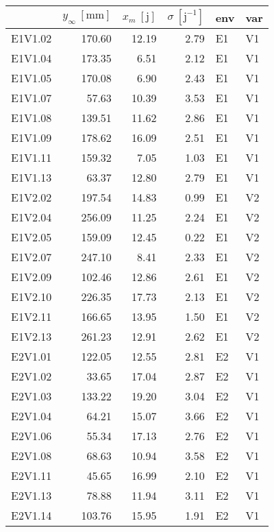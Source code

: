 \begin{table}[ht]
\centering
\begingroup\scriptsize
\begin{tabular}{rrrrll}
  \hline
 & $y_\infty\ \left[\text{mm}\right]$ & $x_m\ \left[\text{j}\right]$ & $\sigma\ \left[\text{j}^{-1}\right]$ & env & var \\ 
  \hline
E1V1.02 & 170.60 & 12.19 & 2.79 & E1 & V1 \\ 
  E1V1.04 & 173.35 & 6.51 & 2.12 & E1 & V1 \\ 
  E1V1.05 & 170.08 & 6.90 & 2.43 & E1 & V1 \\ 
  E1V1.07 & 57.63 & 10.39 & 3.53 & E1 & V1 \\ 
  E1V1.08 & 139.51 & 11.62 & 2.86 & E1 & V1 \\ 
  E1V1.09 & 178.62 & 16.09 & 2.51 & E1 & V1 \\ 
  E1V1.11 & 159.32 & 7.05 & 1.03 & E1 & V1 \\ 
  E1V1.13 & 63.37 & 12.80 & 2.79 & E1 & V1 \\ 
  E1V2.02 & 197.54 & 14.83 & 0.99 & E1 & V2 \\ 
  E1V2.04 & 256.09 & 11.25 & 2.24 & E1 & V2 \\ 
  E1V2.05 & 159.09 & 12.45 & 0.22 & E1 & V2 \\ 
  E1V2.07 & 247.10 & 8.41 & 2.33 & E1 & V2 \\ 
  E1V2.09 & 102.46 & 12.86 & 2.61 & E1 & V2 \\ 
  E1V2.10 & 226.35 & 17.73 & 2.13 & E1 & V2 \\ 
  E1V2.11 & 166.65 & 13.95 & 1.50 & E1 & V2 \\ 
  E1V2.13 & 261.23 & 12.91 & 2.62 & E1 & V2 \\ 
  E2V1.01 & 122.05 & 12.55 & 2.81 & E2 & V1 \\ 
  E2V1.02 & 33.65 & 17.04 & 2.87 & E2 & V1 \\ 
  E2V1.03 & 133.22 & 19.20 & 3.04 & E2 & V1 \\ 
  E2V1.04 & 64.21 & 15.07 & 3.66 & E2 & V1 \\ 
  E2V1.06 & 55.34 & 17.13 & 2.76 & E2 & V1 \\ 
  E2V1.08 & 68.63 & 10.94 & 3.58 & E2 & V1 \\ 
  E2V1.11 & 45.65 & 16.99 & 2.10 & E2 & V1 \\ 
  E2V1.13 & 78.88 & 11.94 & 3.11 & E2 & V1 \\ 
  E2V1.14 & 103.76 & 15.95 & 1.91 & E2 & V1 \\ 

\end{tabular}
\end{table}
